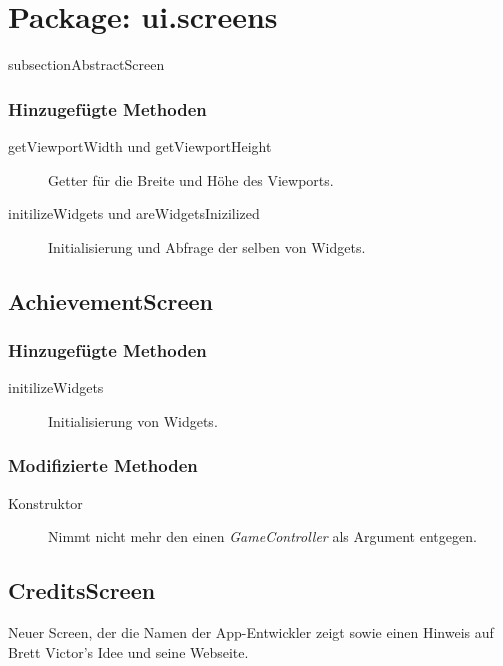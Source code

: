 \section{Package: ui.screens}

subsection{AbstractScreen}

\subsubsection{Hinzugefügte Methoden}
\begin{description}
\item[getViewportWidth und getViewportHeight]
Getter für die Breite und Höhe des Viewports.

\item[initilizeWidgets und areWidgetsInizilized]
Initialisierung und Abfrage der selben von Widgets.

\end{description}


\subsection{AchievementScreen}

\subsubsection{Hinzugefügte Methoden}
\begin{description}
\item[initilizeWidgets]
Initialisierung von Widgets.

\end{description}

\subsubsection{Modifizierte Methoden}
\begin{description}
\item[Konstruktor]
Nimmt nicht mehr den einen \emph{GameController} als Argument entgegen.

\end{description}



\subsection{CreditsScreen}
Neuer Screen, der die Namen der App-Entwickler zeigt sowie einen Hinweis auf Brett Victor's Idee und seine Webseite.

